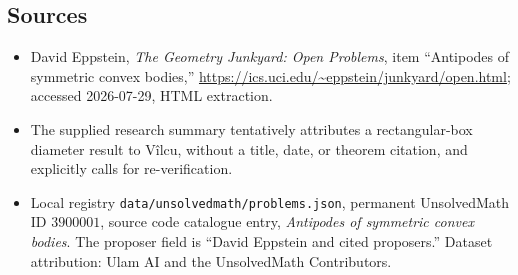 \documentclass[11pt]{article}
\begin{document}
\subsection{Sources}
\begin{itemize}
\item David Eppstein, \emph{The Geometry Junkyard: Open Problems}, item ``Antipodes of symmetric convex bodies,'' \url{https://ics.uci.edu/~eppstein/junkyard/open.html}; accessed 2026-07-29, HTML extraction.
\item The supplied research summary tentatively attributes a rectangular-box diameter result to V\^ilcu, without a title, date, or theorem citation, and explicitly calls for re-verification.
\item Local registry \texttt{data/unsolvedmath/problems.json}, permanent UnsolvedMath ID $3900001$, source code catalogue entry, \emph{Antipodes of symmetric convex bodies}. The proposer field is ``David Eppstein and cited proposers.'' Dataset attribution: Ulam AI and the UnsolvedMath Contributors.
\end{itemize}
\end{document}
